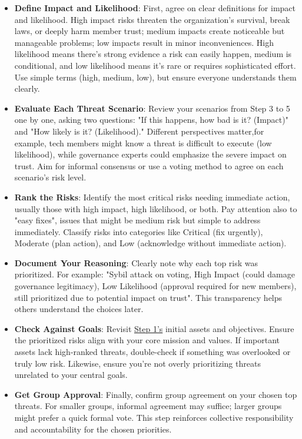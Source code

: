 \begin{itemize}

    \item \textbf{Define Impact and Likelihood}: First, agree on clear
    definitions for impact and likelihood. High impact risks threaten the
    organization's survival, break laws, or deeply harm member trust; medium impacts
    create noticeable but manageable problems; low impacts result in minor
    inconveniences. High likelihood means there's strong evidence a risk can easily
    happen, medium is conditional, and low likelihood means it's rare or requires
    sophisticated effort. Use simple terms (high, medium, low), but ensure everyone
    understands them clearly.
    
    \item \textbf{Evaluate Each Threat Scenario}: Review your scenarios from Step 3 to 5 one by one,
    asking two questions: "If this happens, how bad is it? (Impact)" and "How likely
    is it? (Likelihood)." Different perspectives matter,for example, tech members
    might know a threat is difficult to execute (low likelihood), while governance
    experts could emphasize the severe impact on trust. Aim for informal consensus
    or use a voting method to agree on each scenario's risk level.
    
    \item \textbf{Rank the Risks}: Identify the most critical risks needing immediate
    action, usually those with high impact, high likelihood, or both. Pay attention
    also to "easy fixes", issues that might be medium risk but simple to address
    immediately. Classify risks into categories like Critical (fix urgently),
    Moderate (plan action), and Low (acknowledge without immediate action).
    
    \item \textbf{Document Your Reasoning}: Clearly note why each top risk was
    prioritized. For example: "Sybil attack on voting, High Impact (could damage
    governance legitimacy), Low Likelihood (approval required for new members), still
    prioritized due to potential impact on trust". This transparency helps others
    understand the choices later.
    
    \item \textbf{Check Against Goals}: Revisit \hyperref[subsec:Step1]{Step 1's} initial assets and objectives.
    Ensure the prioritized risks align with your core mission and values. If
    important assets lack high-ranked threats, double-check if something was
    overlooked or truly low risk. Likewise, ensure you're not overly prioritizing
    threats unrelated to your central goals.
    
    \item \textbf{Get Group Approval}: Finally, confirm group agreement on your chosen
    top threats. For smaller groups, informal agreement may suffice; larger groups
    might prefer a quick formal vote. This step reinforces collective responsibility
    and accountability for the chosen priorities.

\end{itemize}
    
